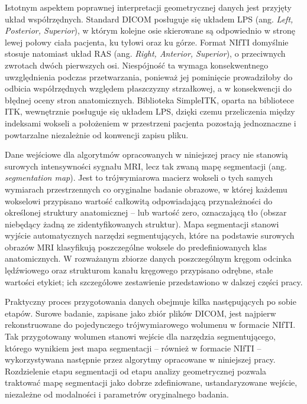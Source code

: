 Istotnym aspektem poprawnej interpretacji geometrycznej danych jest przyjęty układ współrzędnych. Standard DICOM posługuje się układem LPS (ang. \textit{Left, Posterior, Superior}), w którym kolejne osie skierowane są odpowiednio w stronę lewej połowy ciała pacjenta, ku tyłowi oraz ku górze.
Format NIfTI domyślnie stosuje natomiast układ RAS (ang. \textit{Right, Anterior, Superior}), o przeciwnych zwrotach dwóch pierwszych osi.
Niespójność ta wymaga konsekwentnego uwzględnienia podczas przetwarzania, ponieważ jej pominięcie prowadziłoby do odbicia współrzędnych względem płaszczyzny strzałkowej, a w konsekwencji do błędnej oceny stron anatomicznych.
Biblioteka SimpleITK, oparta na bibliotece ITK, wewnętrznie posługuje się układem LPS, dzięki czemu przeliczenia między indeksami wokseli a położeniem w przestrzeni pacjenta pozostają jednoznaczne i powtarzalne niezależnie od konwencji zapisu pliku.

Dane wejściowe dla algorytmów opracowanych w niniejszej pracy nie stanowią surowych intensywności sygnału MRI, lecz tak zwaną mapę segmentacji (ang. \textit{segmentation map}). Jest to trójwymiarowa macierz wokseli o tych samych wymiarach przestrzennych co oryginalne badanie obrazowe, w której każdemu wokselowi przypisano wartość całkowitą odpowiadającą przynależności do określonej struktury anatomicznej -- lub wartość zero, oznaczającą tło (obszar niebędący żadną ze zidentyfikowanych struktur). Mapa segmentacji stanowi wyjście automatycznych narzędzi segmentujących, które na podstawie surowych obrazów MRI klasyfikują poszczególne woksele do predefiniowanych klas anatomicznych. %
W rozważanym zbiorze danych poszczególnym kręgom odcinka lędźwiowego oraz strukturom kanału kręgowego przypisano odrębne, stałe wartości etykiet; ich szczegółowe zestawienie przedstawiono w dalszej części pracy.

Praktyczny proces przygotowania danych obejmuje kilka następujących po sobie etapów.
Surowe badanie, zapisane jako zbiór plików DICOM, jest najpierw rekonstruowane do pojedynczego trójwymiarowego wolumenu w formacie NIfTI.
Tak przygotowany wolumen stanowi wejście dla narzędzia segmentującego, którego wynikiem jest mapa segmentacji -- również w formacie NIfTI -- wykorzystywana następnie przez algorytmy opracowane w niniejszej pracy.
Rozdzielenie etapu segmentacji od etapu analizy geometrycznej pozwala traktować mapę segmentacji jako dobrze zdefiniowane, ustandaryzowane wejście, niezależne od modalności i parametrów oryginalnego badania.

